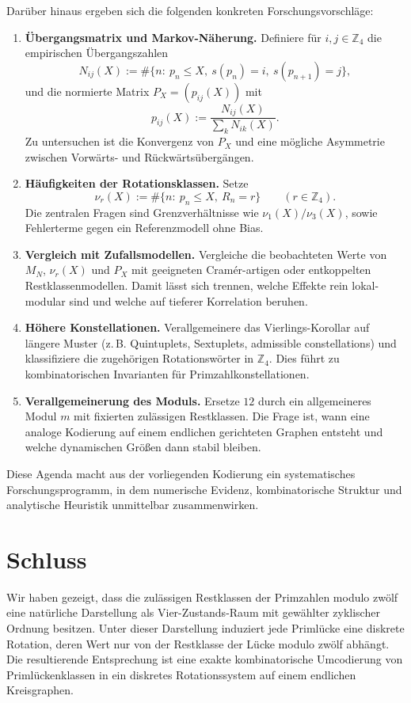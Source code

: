 \documentclass[11pt]{article}
\theoremstyle{definition}
\begin{document}
Dar\"uber hinaus ergeben sich die folgenden konkreten Forschungsvorschl\"age:
\begin{enumerate}[label=\textbf{F\arabic*:},leftmargin=*,itemsep=0.35em]
\item \textbf{\"Ubergangsmatrix und Markov-N\"aherung.}
Definiere f\"ur $i,j\in\mathbb{Z}_4$ die empirischen \"Ubergangszahlen
\[
N_{ij}(X):=\#\{n:\ p_n\le X,\ s(p_n)=i,\ s(p_{n+1})=j\},
\]
und die normierte Matrix $P_X=(p_{ij}(X))$ mit
\[
p_{ij}(X):=\frac{N_{ij}(X)}{\sum_{k}N_{ik}(X)}.
\]
Zu untersuchen ist die Konvergenz von $P_X$ und eine m\"ogliche Asymmetrie zwischen Vorw\"arts- und R\"uckw\"arts\"uberg\"angen.

\item \textbf{H\"aufigkeiten der Rotationsklassen.}
Setze
\[
\nu_r(X):=\#\{n:\ p_n\le X,\ R_n=r\}\qquad (r\in\mathbb{Z}_4).
\]
Die zentralen Fragen sind Grenzverh\"altnisse wie $\nu_1(X)/\nu_3(X)$, sowie Fehlerterme gegen ein Referenzmodell ohne Bias.

\item \textbf{Vergleich mit Zufallsmodellen.}
Vergleiche die beobachteten Werte von $M_N$, $\nu_r(X)$ und $P_X$ mit
geeigneten Cram\'er-artigen oder entkoppelten Restklassenmodellen.
Damit l\"asst sich trennen, welche Effekte rein lokal-modular sind und welche auf tieferer Korrelation beruhen.

\item \textbf{H\"ohere Konstellationen.}
Verallgemeinere das Vierlings-Korollar auf l\"angere Muster (z.\,B. Quintuplets,
Sextuplets, admissible constellations) und klassifiziere die zugeh\"origen
Rotationsw\"orter in $\mathbb{Z}_4$.
Dies f\"uhrt zu kombinatorischen Invarianten f\"ur Primzahlkonstellationen.

\item \textbf{Verallgemeinerung des Moduls.}
Ersetze $12$ durch ein allgemeineres Modul $m$ mit fixierten zul\"assigen Restklassen.
Die Frage ist, wann eine analoge Kodierung auf einem endlichen gerichteten Graphen
entsteht und welche dynamischen Gr\"o{\ss}en dann stabil bleiben.
\end{enumerate}

Diese Agenda macht aus der vorliegenden Kodierung ein systematisches Forschungsprogramm,
in dem numerische Evidenz, kombinatorische Struktur und analytische Heuristik unmittelbar zusammenwirken.

\section{Schluss}

Wir haben gezeigt, dass die zul\"assigen Restklassen der Primzahlen modulo zw\"olf eine nat\"urliche Darstellung als Vier-Zustands-Raum mit gew\"ahlter zyklischer Ordnung besitzen.
Unter dieser Darstellung induziert jede Priml\"ucke eine diskrete Rotation, deren Wert nur von der Restklasse der L\"ucke modulo zw\"olf abh\"angt.
Die resultierende Entsprechung ist eine exakte kombinatorische Umcodierung von Priml\"uckenklassen in ein diskretes Rotationssystem auf einem endlichen Kreisgraphen.
\end{document}
